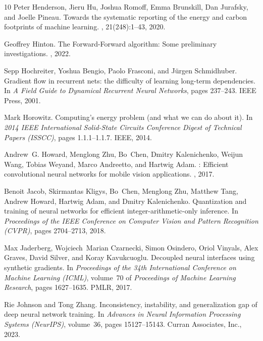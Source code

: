 \documentclass[11pt, english]{article}
\begin{document}
\begin{thebibliography}{10}
Peter Henderson, Jieru Hu, Joshua Romoff, Emma Brunskill, Dan Jurafsky, and
  Joelle Pineau.
\newblock Towards the systematic reporting of the energy and carbon footprints
  of machine learning.
, 21(248):1--43, 2020.

Geoffrey Hinton.
\newblock The {Forward-Forward} algorithm: Some preliminary investigations.
, 2022.

Sepp Hochreiter, Yoshua Bengio, Paolo Frasconi, and J{\"u}rgen Schmidhuber.
\newblock Gradient flow in recurrent nets: the difficulty of learning
  long-term dependencies.
\newblock In {\em A Field Guide to Dynamical Recurrent Neural Networks}, pages
  237--243. {IEEE Press}, 2001.

Mark Horowitz.
\newblock Computing's energy problem (and what we can do about it).
\newblock In {\em 2014 {IEEE} International Solid-State Circuits Conference
  Digest of Technical Papers (ISSCC)}, pages 1.1.1--1.1.7. {IEEE}, 2014.

Andrew~G. Howard, Menglong Zhu, Bo~Chen, Dmitry Kalenichenko, Weijun Wang,
  Tobias Weyand, Marco Andreetto, and Hartwig Adam.
: Efficient convolutional neural networks for mobile
  vision applications.
, 2017.

Benoit Jacob, Skirmantas Kligys, Bo~Chen, Menglong Zhu, Matthew Tang, Andrew
  Howard, Hartwig Adam, and Dmitry Kalenichenko.
\newblock Quantization and training of neural networks for efficient
  integer-arithmetic-only inference.
\newblock In {\em Proceedings of the {IEEE} Conference on Computer Vision and
  Pattern Recognition (CVPR)}, pages 2704--2713, 2018.

Max Jaderberg, Wojciech~Marian Czarnecki, Simon Osindero, Oriol Vinyals, Alex
  Graves, David Silver, and Koray Kavukcuoglu.
\newblock Decoupled neural interfaces using synthetic gradients.
\newblock In {\em Proceedings of the 34th International Conference on Machine
  Learning (ICML)}, volume~70 of {\em Proceedings of Machine Learning
  Research}, pages 1627--1635. PMLR, 2017.

Rie Johnson and Tong Zhang.
\newblock Inconsistency, instability, and generalization gap of deep neural
  network training.
\newblock In {\em Advances in Neural Information Processing Systems (NeurIPS)},
  volume~36, pages 15127--15143. Curran Associates, Inc., 2023.


\end{thebibliography}
\end{document}
